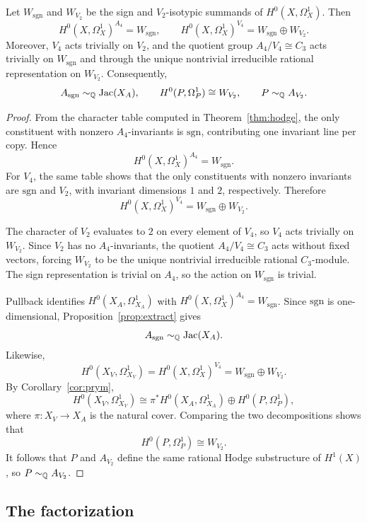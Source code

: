 \begin{proposition}\label{prop:sgn-v2}
Let \(W_{\mathrm{sgn}}\) and \(W_{V_2}\) be the sign and \(V_2\)-isotypic summands of \(H^0(X,\Omega_X^1)\). Then
\[
H^0(X,\Omega_X^1)^{A_4}=W_{\mathrm{sgn}},
\qquad
H^0(X,\Omega_X^1)^{V_4}=W_{\mathrm{sgn}}\oplus W_{V_2}.
\]
Moreover, \(V_4\) acts trivially on \(V_2\), and the quotient group \(A_4/V_4\cong C_3\) acts trivially on \(W_{\mathrm{sgn}}\) and through the unique nontrivial irreducible rational representation on \(W_{V_2}\). Consequently,
\[
A_{\mathrm{sgn}}\sim_{\mathbb{Q}}\operatorname{Jac}(X_A),
\qquad
H^0(P,\Omega_P^1)\cong W_{V_2},
\qquad
P\sim_{\mathbb{Q}}A_{V_2}.
\]
\end{proposition}

\begin{proof}
From the character table computed in Theorem~\ref{thm:hodge}, the only constituent with nonzero \(A_4\)-invariants is \(\mathrm{sgn}\), contributing one invariant line per copy. Hence
\[
H^0(X,\Omega_X^1)^{A_4}=W_{\mathrm{sgn}}.
\]
For \(V_4\), the same table shows that the only constituents with nonzero invariants are \(\mathrm{sgn}\) and \(V_2\), with invariant dimensions \(1\) and \(2\), respectively. Therefore
\[
H^0(X,\Omega_X^1)^{V_4}=W_{\mathrm{sgn}}\oplus W_{V_2}.
\]

The character of \(V_2\) evaluates to \(2\) on every element of \(V_4\), so \(V_4\) acts trivially on \(W_{V_2}\). Since \(V_2\) has no \(A_4\)-invariants, the quotient \(A_4/V_4\cong C_3\) acts without fixed vectors, forcing \(W_{V_2}\) to be the unique nontrivial irreducible rational \(C_3\)-module. The sign representation is trivial on \(A_4\), so the action on \(W_{\mathrm{sgn}}\) is trivial.

Pullback identifies \(H^0(X_A,\Omega_{X_A}^1)\) with \(H^0(X,\Omega_X^1)^{A_4}=W_{\mathrm{sgn}}\). Since \(\mathrm{sgn}\) is one-dimensional, Proposition~\ref{prop:extract} gives
\[
A_{\mathrm{sgn}}\sim_{\mathbb{Q}}\operatorname{Jac}(X_A).
\]
Likewise,
\[
H^0(X_V,\Omega_{X_V}^1)=H^0(X,\Omega_X^1)^{V_4}=W_{\mathrm{sgn}}\oplus W_{V_2}.
\]
By Corollary~\ref{cor:prym},
\[
H^0(X_V,\Omega_{X_V}^1)\cong \pi^*H^0(X_A,\Omega_{X_A}^1)\oplus H^0(P,\Omega_P^1),
\]
where \(\pi:X_V\to X_A\) is the natural cover. Comparing the two decompositions shows that
\[
H^0(P,\Omega_P^1)\cong W_{V_2}.
\]
It follows that \(P\) and \(A_{V_2}\) define the same rational Hodge substructure of \(H^1(X)\), so \(P\sim_{\mathbb{Q}}A_{V_2}\).
\end{proof}

\subsection{The factorization}

